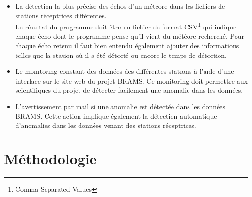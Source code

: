 \documentclass[11pt]{article}
\begin{document}
\begin{itemize}
    \item La détection la plus précise des échos d'un météore dans les fichiers de stations réceptrices différentes.\\
          Le résultat du programme doit être un fichier de format CSV\footnote{Comma Separated Values} qui indique chaque écho dont le programme pense qu'il vient du météore recherché.
          Pour chaque écho retenu il faut bien entendu également ajouter des informations telles que la station où il a été détecté ou encore le temps de détection.
    \item Le monitoring constant des données des différentes stations à l'aide d'une interface sur le site web du projet BRAMS.
          Ce monitoring doit permettre aux scientifiques du projet de détecter facilement une anomalie dans les données.
    \item L'avertissement par mail si une anomalie est détectée dans les données BRAMS.
          Cette action implique également la détection automatique d'anomalies dans les données venant des stations réceptrices.
\end{itemize}

\newpage

\section{Méthodologie}
\end{document}

